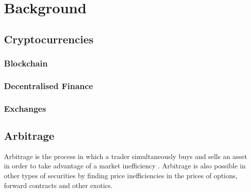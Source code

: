 \chapter{Background}

\section{Cryptocurrencies}
\subsection{Blockchain}
\subsection{Decentralised Finance}
\subsection{Exchanges}

\section{Arbitrage}
Arbitrage is the process in which a trader simultaneously buys and sells an asset in order to take advantage of a market inefficiency \cite{businessinsightsblog_2021}. Arbitrage is also possible in other types of securities by finding price inefficiencies in the prices of options, forward contracts and other exotics.


